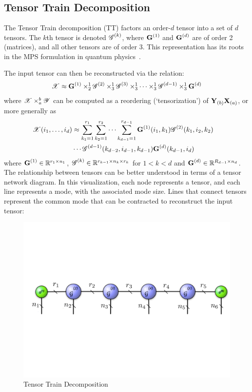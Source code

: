 \subsection{Tensor Train Decomposition}
The Tensor Train decomposition (TT) factors an order-$d$ tensor into a set of $d$ tensors. The $k$th tensor is denoted $\T{G}^{(k)}$, where $\M{G}^{(1)}$ and $\M{G}^{(d)}$ are of order 2 (matrices), and all other tensors are of order 3. This representation has its roots in the MPS formulation in quantum physics~\cite{PhysRevLett.75.3537}.

The input tensor can then be reconstructed via the relation:
\begin{equation}
\T{X} \approx \M{G}^{(1)} \times_{2}^1 \T{G}^{(2)} \times_{3}^1 \T{G}^{(3)} \times_3^1 \dots
\times_3^1 \T{G}^{(d-1)}\times_3^1 \M{G}^{(d)} 
\end{equation}
where $\T{X} \times_a^b \T{Y}$ can be computed as a reordering (`tensorization') of $\M{Y}_{(b)} \M{X}_{(a)}$, or more generally as 
\begin{align*}
\T{X}(i_1,\dots,i_d) & \approx  
\sum_{{k_1}=1}^{r_1} \sum_{{k_2}=1}^{r_2}\cdots\sum_{{k_{d-1}}=1}^{r_{d-1}} \M{G}^{(1)}(i_1,k_1)\T{G}^{(2)}(k_1,i_2,k_2) & \\ & \cdots\T{G}^{(d-1)}(k_{d-2},i_{d-1},k_{d-1})\M{G}^{(d)}(k_{d-1},i_d)
\end{align*}
where $\M{G}^{(1)}\in \R^{r_1\times n_1}$, $\T{G}^{(k)} \in \R^{r_{k-1}\times n_k \times r_k}$ for $1< k< d$ and $\M{G}^{(d)}\in \R^{R_{d-1}\times n_d}$. The relationship between tensors can be better understood in terms of a tensor network diagram. In this visualization, each node represents a tensor, and each line represents a mode, with the associated mode size. Lines that connect tensors represent the common mode that can be contracted to reconstruct the input tensor:
\begin{figure}[htbp]
    \center\includegraphics[width=0.80\linewidth]{thpropfigs/tensortrain}
    \caption{Tensor Train Decomposition}
\end{figure}
